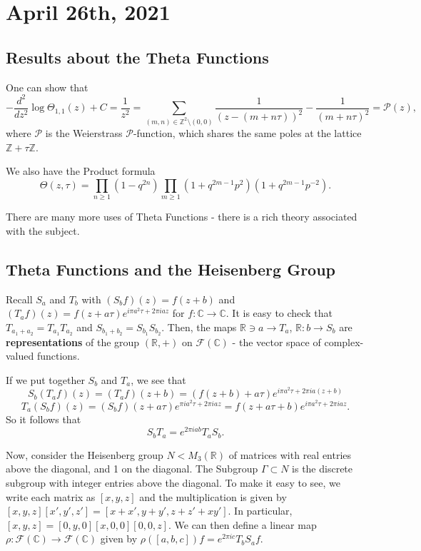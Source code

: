 \documentclass[12pt]{scrartcl}
\newcommand{\Z}{\mathbb{Z}}
\newcommand{\R}{\mathbb{R}}
\newcommand{\C}{\mathbb C}
\let \mc \mathcal
\begin{document}
\section{April 26th, 2021}
\subsection{Results about the Theta Functions}
One can show that 
$$-\frac{d^2}{dz^2} \log \Theta_{1, 1} (z ) + C = \frac{1}{z^2} = \sum_{(m, n) \in \Z^2 \setminus (0, 0)} \frac{1}{(z - (m + n\tau))^2} - \frac{1}{(m + n \tau)^2} = \mathscr P(z),$$
where $\mathscr P$ is the Weierstrass $\mathscr P$-function, which shares the same poles at the lattice $\Z + \tau \Z$.

We also have the Product formula
$$\Theta(z, \tau) = \prod_{n \ge 1} (1 - q^{2n}) \prod_{m \ge 1} (1 + q^{2m-1}p^2)(1 + q^{2m-1}p^{-2}).$$

There are many more uses of Theta Functions - there is a rich theory associated with the subject.  

\subsection{Theta Functions and the Heisenberg Group}
Recall $S_a$ and $T_b$ with $(S_b f)(z) = f(z + b)$ and $(T_a f)(z) = f(z + a\tau )e^{i \pi a^2 \tau + 2 \pi i a z}$ for $f: \C \to \C$.  It is easy to check that $T_{a_1 + a_2} = T_{a_1} T_{a_2}$ and $S_{b_1 + b_2} = S_{b_1}S_{b_2}$.  Then, the maps $\R \ni a \to T_a$, $\R: b \to S_b$ are \textbf{representations} of the group $(\R, +)$ on $\mc F(\C)$ - the vector space of complex-valued functions.  

If we put together $S_b$ and $T_a$, we see that 
$$S_b(T_a f)(z) = (T_a f) (z + b) = (f(z + b) + a\tau) e^{i \pi a^2 \tau + 2\pi i a (z + b)} $$
$$T_a(S_b f)(z) = (S_b f) (z + a \tau) e^{\pi i a^2 \tau + 2\pi i a z} = f(z + a \tau + b) e^{i \pi a^2 \tau + 2 \pi i a z}.$$
So it follows that 
$$S_b T_a = e^{2 \pi i a b} T_a S_b.$$

Now, consider the Heisenberg group $N < M_3(\R)$ of matrices with real entries above the diagonal, and 1 on the diagonal.  The Subgroup $\Gamma \subset N$ is the discrete subgroup with integer entries above the diagonal.  
To make it easy to see, we write each matrix as $[x, y, z]$ and the multiplication is given by $[x, y, z] [x', y', z'] = [x + x', y+y', z + z' + xy']$.  In particular, $[x, y, z] = [0, y, 0][x, 0, 0][0, 0, z]$.  We can then define a linear map $\rho: \mc F(\C) \to \mc F(\C)$ given by $\rho([a, b, c]) f = e^{2 \pi i c} T_b S_a f$.
\end{document}
